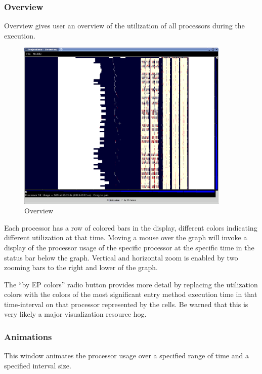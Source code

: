 \documentclass[10pt]{article}
\begin{document}
\subsubsection{Overview}

Overview gives user an overview of the utilization of all processors
during the execution. 

\begin{figure}[htb]
\center
\includegraphics[width=4.0in]{fig/overview}
\caption{Overview}
\label{overview}
\end{figure}

Each processor has a row of colored bars in the display, different
colors indicating different utilization at that time. Moving a mouse
over the graph will invoke a display of the processor usage of the
specific processor at the specific time in the status bar below the
graph. Vertical and horizontal zoom is enabled by two zooming bars to
the right and lower of the graph.

The ``by EP colors'' radio button provides more detail by replacing
the utilization colors with the colors of the most significant entry
method execution time in that time-interval on that processor
represented by the cells. Be warned that this is very likely a major
visualization resource hog.

\subsubsection{Animations}

This window animates the processor usage over a specified range of
time and a specified interval size. 
\end{document}
